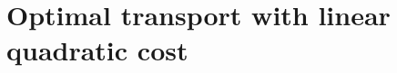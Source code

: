 \documentclass[reqno]{amsart}
\theoremstyle{plain}
\theoremstyle{definition}
\theoremstyle{remark}
\newtheorem{exmp}[thm]{Example}
\begin{document}

\section{Optimal transport with linear quadratic cost}
\end{document}
